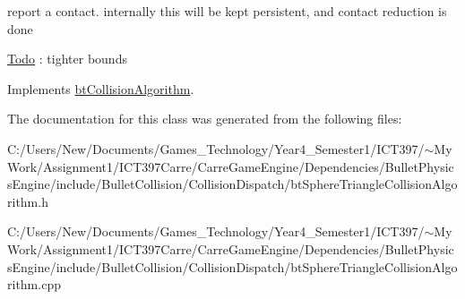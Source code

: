 report a contact. internally this will be kept persistent, and contact reduction is done

\begin{Desc}
\item[\hyperlink{todo__todo000018}{Todo}]: tighter bounds \end{Desc}


Implements \hyperlink{classbt_collision_algorithm}{btCollisionAlgorithm}.

The documentation for this class was generated from the following files:\begin{CompactItemize}
\item 
C:/Users/New/Documents/Games\_\-Technology/Year4\_\-Semester1/ICT397/$\sim$My Work/Assignment1/ICT397Carre/CarreGameEngine/Dependencies/BulletPhysicsEngine/include/BulletCollision/CollisionDispatch/btSphereTriangleCollisionAlgorithm.h\item 
C:/Users/New/Documents/Games\_\-Technology/Year4\_\-Semester1/ICT397/$\sim$My Work/Assignment1/ICT397Carre/CarreGameEngine/Dependencies/BulletPhysicsEngine/include/BulletCollision/CollisionDispatch/btSphereTriangleCollisionAlgorithm.cpp\end{CompactItemize}
